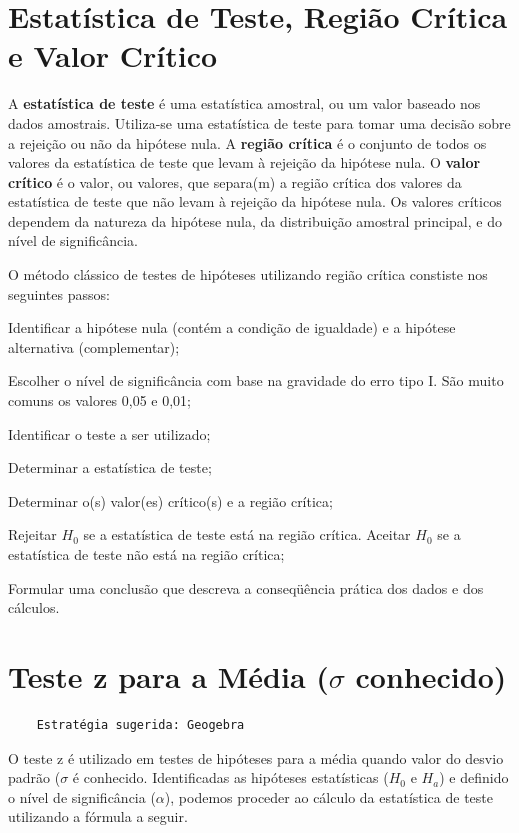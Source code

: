 \section{Estatística de Teste, Região Crítica e Valor Crítico}

A \textbf{estatística de teste} é uma estatística amostral, ou um valor baseado nos dados
amostrais. Utiliza-se uma estatística de teste para tomar uma decisão sobre a rejeição ou não da hipótese nula. A \textbf{região crítica} é o conjunto de todos os valores da estatística de teste que levam à rejeição da hipótese nula. O \textbf{valor crítico} é o valor, ou valores, que separa(m) a região crítica dos valores da estatística de teste que não levam à rejeição da hipótese nula. Os valores críticos dependem da natureza da hipótese nula, da distribuição amostral principal, e do nível de significância.

O método clássico de testes de hipóteses  utilizando região crítica constiste nos seguintes passos:
\begin{alineas}
\item Identificar a hipótese nula (contém a condição de igualdade) e a hipótese alternativa (complementar);
\item Escolher o nível de significância com base na gravidade do erro tipo I. São
muito comuns os valores 0,05 e 0,01;
\item Identificar o teste a ser utilizado;
\item Determinar a estatística de teste;
\item Determinar o(s) valor(es) crítico(s) e a região crítica;
\item Rejeitar \(H_0\) se a estatística de teste está na região crítica. Aceitar \(H_0\) se a estatística de teste não está na região crítica;
\item Formular uma conclusão que descreva a conseqüência prática dos dados e dos cálculos.
\end{alineas}

\section{Teste z para a Média (\(\sigma\) conhecido)}

\begin{verbatim}
	Estratégia sugerida: Geogebra
\end{verbatim}

O teste z é utilizado em testes de hipóteses para a média quando valor do desvio padrão (\(\sigma\) é conhecido. Identificadas as hipóteses estatísticas (\(H_0\) e \(H_a\)) e definido o nível de significância (\(\alpha\)), podemos proceder ao cálculo da estatística de teste utilizando a fórmula a seguir.

